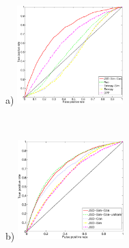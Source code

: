 \begin{figure}[t!]
  \centering
  \begin{subfigure}
(a)\hspace{-1mm}
    \centering
    \includegraphics[width=0.45\textwidth]{figures/phonecases-comparison-new.eps}
\hspace{4mm}
  \end{subfigure}%
  ~
  \begin{subfigure}
(b) \hspace{-1mm}
    \centering
    \includegraphics[width=0.45\textwidth]{figures/phonecases-breakdown-new.eps}
  \end{subfigure}
  

\end{figure}

